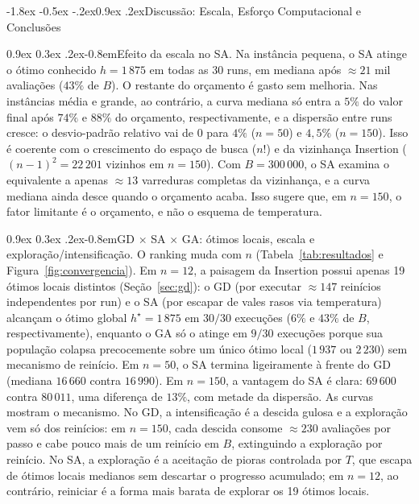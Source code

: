 \documentclass[10pt,a4paper,twocolumn]{article}
\makeatletter
\renewcommand\section{\@startsection {section}{1}{\z@}%
  {-1.8ex \@plus -0.5ex \@minus -.2ex}{0.9ex \@plus.2ex}{\normalfont\large\bfseries}}
\renewcommand\paragraph{\@startsection{paragraph}{4}{\z@}%
  {0.9ex \@plus 0.3ex \@minus .2ex}{-0.8em}{\normalfont\normalsize\bfseries}}
\makeatother
\begin{document}
\section{Discussão: Escala, Esforço Computacional e Conclusões}
\label{sec:discussao}

\paragraph{Efeito da escala no SA.}
Na instância pequena, o SA atinge o ótimo conhecido $h=1\,875$ em todas as 30 runs, em
mediana após $\approx 21$ mil avaliações ($43\%$ de $B$). O restante do orçamento é
gasto sem melhoria. Nas instâncias média e grande, ao contrário, a curva mediana só
entra a $5\%$ do valor final após $74\%$ e $88\%$ do orçamento, respectivamente, e
a dispersão entre runs cresce: o desvio-padrão relativo vai de $0$ para $4\%$
($n=50$) e $4{,}5\%$ ($n=150$). Isso é coerente com o crescimento do espaço de busca
($n!$) e da vizinhança Insertion ($(n-1)^2 = 22\,201$ vizinhos em $n=150$). Com
$B=300\,000$, o SA examina o equivalente a apenas $\approx 13$ varreduras completas
da vizinhança, e a curva mediana ainda desce quando o orçamento acaba. Isso sugere que, em
$n=150$, o fator limitante é o orçamento, e não o esquema de temperatura.

\paragraph{GD $\times$ SA $\times$ GA: ótimos locais, escala e exploração/intensificação.}
O ranking muda com $n$ (Tabela~\ref{tab:resultados} e
Figura~\ref{fig:convergencia}). Em $n=12$, a paisagem da Insertion possui apenas 19
ótimos locais distintos (Seção~\ref{sec:gd}): o GD (por executar $\approx 147$
reinícios independentes por run) e o SA (por escapar de vales rasos via temperatura)
alcançam o ótimo global $h^\star=1\,875$ em $30/30$ execuções ($6\%$ e $43\%$ de $B$,
respectivamente), enquanto o GA só o atinge em $9/30$ execuções porque sua população
colapsa precocemente sobre um único ótimo local ($1\,937$ ou $2\,230$) sem mecanismo de
reinício. Em $n=50$, o SA termina ligeiramente à frente do GD (mediana
$16\,660$ contra $16\,990$). Em $n=150$, a vantagem do SA é clara: $69\,600$ contra
$80\,011$, uma diferença de $13\%$, com metade da dispersão. As curvas mostram o
mecanismo. No GD, a intensificação é a descida gulosa e a exploração vem só dos
reinícios: em $n=150$, cada descida consome $\approx 230$ avaliações por passo e cabe
pouco mais de um reinício em $B$, extinguindo a exploração por reinício. No
SA, a exploração é a aceitação de pioras controlada por $T$, que escapa de ótimos
locais medianos sem descartar o progresso acumulado; em $n=12$, ao contrário, reiniciar
é a forma mais barata de explorar os 19 ótimos locais.
\end{document}
